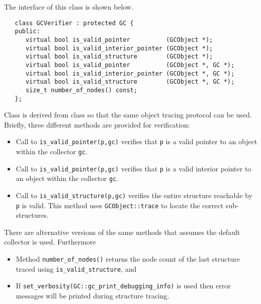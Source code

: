    The interface of this class is shown below.

\begin{verbatim}
   class GCVerifier : protected GC {
   public:
      virtual bool is_valid_pointer          (GCObject *);
      virtual bool is_valid_interior_pointer (GCObject *);
      virtual bool is_valid_structure        (GCObject *);
      virtual bool is_valid_pointer          (GCObject *, GC *);
      virtual bool is_valid_interior_pointer (GCObject *, GC *);
      virtual bool is_valid_structure        (GCObject *, GC *);
      size_t number_of_nodes() const;
   };
\end{verbatim}

   Class  is derived from class  so that the
same object tracing protocol can be used.  Briefly, three different methods 
are provided for verification:
\begin{itemize}
   \item Call to \verb|is_valid_pointer(p,gc)| verifies that
    \verb|p| is a valid pointer to an object within the collector \verb|gc|. 
   \item Call to \verb|is_valid_pointer(p,gc)| verifies that
    \verb|p| is a valid interior pointer to an object 
     within the collector \verb|gc|. 
   \item Call to \verb|is_valid_structure(p,gc)| verifies the entire
     structure reachable by \verb|p| is valid.  This method uses
     \verb|GCObject::trace| to locate the correct sub-structures.
\end{itemize}

   There are alternative versions of the same methods that assumes
the default collector is used.   Furthermore
\begin{itemize}
   \item Method \verb|number_of_nodes()| returns the node count of the
last structure traced using \verb|is_valid_structure|, and 
   \item If \verb|set_verbosity(GC::gc_print_debugging_info)| is used
then error messages will be printed during structure tracing.
\end{itemize}





